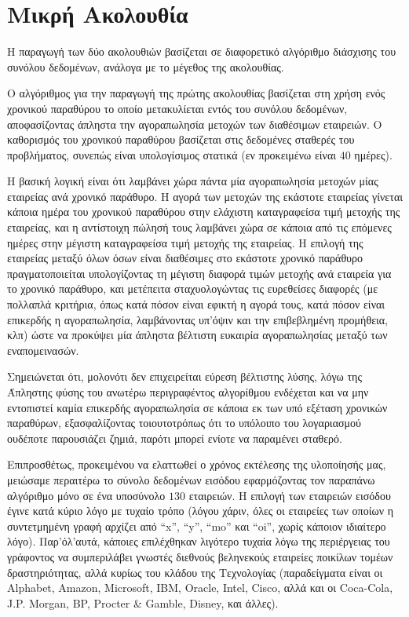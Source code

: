 \section{Μικρή Aκολουθία}


Η παραγωγή των δύο ακολουθιών βασίζεται σε διαφορετικό αλγόριθμο διάσχισης του συνόλου δεδομένων, ανάλογα με το μέγεθος της ακολουθίας.

Ο αλγόριθμος για την παραγωγή της πρώτης ακολουθίας βασίζεται στη χρήση ενός χρονικού παραθύρου το οποίο μετακυλίεται εντός του συνόλου δεδομένων, αποφασίζοντας άπληστα την αγοραπωλησία μετοχών των διαθέσιμων εταιρειών.
Ο καθορισμός του χρονικού παραθύρου βασίζεται στις δεδομένες σταθερές του προβλήματος, συνεπώς είναι υπολογίσιμος στατικά (εν προκειμένω είναι $40$ ημέρες).

Η βασική λογική είναι ότι λαμβάνει χώρα πάντα μία αγοραπωλησία μετοχών μίας εταιρείας ανά χρονικό παράθυρο.
Η αγορά των μετοχών της εκάστοτε εταιρείας γίνεται κάποια ημέρα του χρονικού παραθύρου στην ελάχιστη καταγραφείσα τιμή μετοχής της εταιρείας, και η αντίστοιχη πώλησή τους λαμβάνει χώρα σε κάποια από τις επόμενες ημέρες στην μέγιστη καταγραφείσα τιμή μετοχής της εταιρείας.
Η επιλογή της εταιρείας μεταξύ όλων όσων είναι διαθέσιμες στο εκάστοτε χρονικό παράθυρο πραγματοποιείται υπολογίζοντας τη μέγιστη διαφορά τιμών μετοχής ανά εταιρεία για το χρονικό παράθυρο, και μετέπειτα σταχυολογώντας τις ευρεθείσες διαφορές (με πολλαπλά κριτήρια, όπως κατά πόσον είναι εφικτή η αγορά τους, κατά πόσον είναι επικερδής η αγοραπωλησία, λαμβάνοντας υπ'όψιν και την επιβεβλημένη προμήθεια, κλπ) ώστε να προκύψει μία άπληστα βέλτιστη ευκαιρία αγοραπωλησίας μεταξύ των εναπομεινασών.

Σημειώνεται ότι, μολονότι δεν επιχειρείται εύρεση βέλτιστης λύσης, λόγω της Άπληστης φύσης του ανωτέρω περιγραφέντος αλγορίθμου ενδέχεται και να μην εντοπιστεί καμία επικερδής αγοραπωλησία σε κάποια εκ των υπό εξέταση χρονικών παραθύρων, εξασφαλίζοντας τοιουτοτρόπως ότι το υπόλοιπο του λογαριασμού ουδέποτε παρουσιάζει ζημιά, παρότι μπορεί ενίοτε να παραμένει σταθερό.

Επιπροσθέτως, προκειμένου να ελαττωθεί ο χρόνος εκτέλεσης της υλοποίησής μας, μειώσαμε περαιτέρω το σύνολο δεδομένων εισόδου εφαρμόζοντας τον παραπάνω αλγόριθμο μόνο σε ένα υποσύνολο $130$ εταιρειών.
Η επιλογή των εταιρειών εισόδου έγινε κατά κύριο λόγο με τυχαίο τρόπο (λόγου χάριν, όλες οι εταιρείες των οποίων η συντετμημένη γραφή αρχίζει από ``x'', ``y'', ``mo'' και ``oi'', χωρίς κάποιον ιδιαίτερο λόγο).
Παρ'όλ'αυτά, κάποιες επιλέχθηκαν λιγότερο τυχαία λόγω της περιέργειας του γράφοντος να συμπεριλάβει γνωστές διεθνούς βεληνεκούς εταιρείες ποικίλων τομέων δραστηριότητας, αλλά κυρίως του κλάδου της Τεχνολογίας (παραδείγματα είναι οι Alphabet, Amazon, Microsoft, IBM, Oracle, Intel, Cisco, αλλά και οι Coca-Cola, J.P. Morgan, BP, Procter \& Gamble, Disney, και άλλες).

